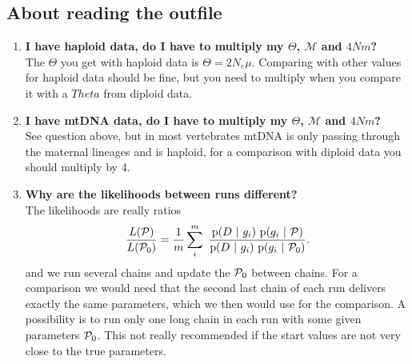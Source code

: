 \subsection{About reading the outfile}
\begin{enumerate}
\item {\bfseries I have haploid data, do I have to multiply my $\Theta$, $\mathcal{M}$ and $4Nm$?}\\
The $\Theta$ you get with haploid data is $\Theta=2N_e\mu$. Comparing with other values for haploid data should be fine, but you need to multiply
when you compare it with a $Theta$ from diploid data.
\\
\item {\bfseries I have mtDNA data, do I have to multiply my $\Theta$, $\mathcal{M}$ and $4Nm$?}\\
See question above, but in most vertebrates mtDNA is only passing through the maternal
lineages and is haploid, for a comparison with diploid data 
you should multiply by 4.


\item {\bfseries Why are the likelihoods between runs different?}\\
The likelihoods are really ratios
$$
\frac{L(\P)}{L(\P_0)} = \frac{1}{m}\sum_i^m\ \frac{ \prob(D\ |\ g_i)\ \prob( g_i\ |\ \P)}
{\prob(D\ |\ g_i)\ \prob( g_i\ |\ \P_0)}.
$$
and we run several chains and update the $\P_0$ between chains.
For a comparison we would need that
the second last chain of each run delivers exactly the same
parameters, which we then would use for the comparison. A possibility is
to run only one long chain in each run with some given parameters
$\P_0$. This not really recommended if the start values are not
very close to the true parameters.


\end{enumerate}
